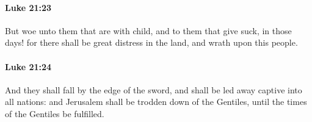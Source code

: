 		\paragraph{Luke 21:23} %
			\label{LUKE-21-23}

			But woe unto them that are with child, and to them that give suck, in those days! for there shall be great distress in the land, and wrath upon this people.

			\begin{framed}
			\scriptsize
				\begin{compactdesc}
					\item[SBLG] 
				\end{compactdesc}
			\end{framed}

		\paragraph{Luke 21:24} %
			\label{LUKE-21-24}

			And they shall fall by the edge of the sword, and shall be led away captive into all nations: and Jerusalem shall be trodden down of the Gentiles, until the times of the Gentiles be fulfilled.

